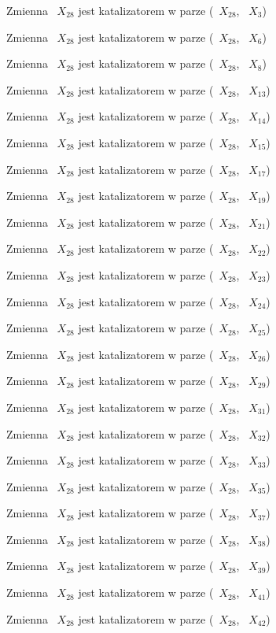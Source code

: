 \documentclass{article}
\begin{document}
Zmienna ~$X_{28}$ jest katalizatorem w parze (~$X_{28}$, ~$X_{3}$)

Zmienna ~$X_{28}$ jest katalizatorem w parze (~$X_{28}$, ~$X_{6}$)

Zmienna ~$X_{28}$ jest katalizatorem w parze (~$X_{28}$, ~$X_{8}$)

Zmienna ~$X_{28}$ jest katalizatorem w parze (~$X_{28}$, ~$X_{13}$)

Zmienna ~$X_{28}$ jest katalizatorem w parze (~$X_{28}$, ~$X_{14}$)

Zmienna ~$X_{28}$ jest katalizatorem w parze (~$X_{28}$, ~$X_{15}$)

Zmienna ~$X_{28}$ jest katalizatorem w parze (~$X_{28}$, ~$X_{17}$)

Zmienna ~$X_{28}$ jest katalizatorem w parze (~$X_{28}$, ~$X_{19}$)

Zmienna ~$X_{28}$ jest katalizatorem w parze (~$X_{28}$, ~$X_{21}$)

Zmienna ~$X_{28}$ jest katalizatorem w parze (~$X_{28}$, ~$X_{22}$)

Zmienna ~$X_{28}$ jest katalizatorem w parze (~$X_{28}$, ~$X_{23}$)

Zmienna ~$X_{28}$ jest katalizatorem w parze (~$X_{28}$, ~$X_{24}$)

Zmienna ~$X_{28}$ jest katalizatorem w parze (~$X_{28}$, ~$X_{25}$)

Zmienna ~$X_{28}$ jest katalizatorem w parze (~$X_{28}$, ~$X_{26}$)

Zmienna ~$X_{28}$ jest katalizatorem w parze (~$X_{28}$, ~$X_{29}$)

Zmienna ~$X_{28}$ jest katalizatorem w parze (~$X_{28}$, ~$X_{31}$)

Zmienna ~$X_{28}$ jest katalizatorem w parze (~$X_{28}$, ~$X_{32}$)

Zmienna ~$X_{28}$ jest katalizatorem w parze (~$X_{28}$, ~$X_{33}$)

Zmienna ~$X_{28}$ jest katalizatorem w parze (~$X_{28}$, ~$X_{35}$)

Zmienna ~$X_{28}$ jest katalizatorem w parze (~$X_{28}$, ~$X_{37}$)

Zmienna ~$X_{28}$ jest katalizatorem w parze (~$X_{28}$, ~$X_{38}$)

Zmienna ~$X_{28}$ jest katalizatorem w parze (~$X_{28}$, ~$X_{39}$)

Zmienna ~$X_{28}$ jest katalizatorem w parze (~$X_{28}$, ~$X_{41}$)

Zmienna ~$X_{28}$ jest katalizatorem w parze (~$X_{28}$, ~$X_{42}$)
\end{document}
